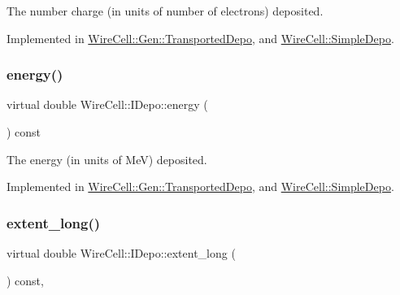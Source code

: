 The number charge (in units of number of electrons) deposited. 



Implemented in \hyperlink{class_wire_cell_1_1_gen_1_1_transported_depo_a448ef0f9244cb3802103f0e15afaa7fa}{Wire\+Cell\+::\+Gen\+::\+Transported\+Depo}, and \hyperlink{class_wire_cell_1_1_simple_depo_a07e9a03fcc18207e8e55ac3ed201828c}{Wire\+Cell\+::\+Simple\+Depo}.

\mbox{\label{class_wire_cell_1_1_i_depo_a5dad2495f4b329fede8397203824f311}} 
\subsubsection{\texorpdfstring{energy()}{energy()}}
{\footnotesize\ttfamily virtual double Wire\+Cell\+::\+I\+Depo\+::energy (\begin{DoxyParamCaption}{ }\end{DoxyParamCaption}) const\hspace{0.3cm}{\ttfamily [pure virtual]}}



The energy (in units of MeV) deposited. 



Implemented in \hyperlink{class_wire_cell_1_1_gen_1_1_transported_depo_a126a3460f7f190b9049bfbbe1b988607}{Wire\+Cell\+::\+Gen\+::\+Transported\+Depo}, and \hyperlink{class_wire_cell_1_1_simple_depo_acea11f65dc7accc767a196963d93cd02}{Wire\+Cell\+::\+Simple\+Depo}.

\mbox{\label{class_wire_cell_1_1_i_depo_a196f71d7d22bf0b85948e2ff8e557c9c}} 
\subsubsection{\texorpdfstring{extent\+\_\+long()}{extent\_long()}}
{\footnotesize\ttfamily virtual double Wire\+Cell\+::\+I\+Depo\+::extent\+\_\+long (\begin{DoxyParamCaption}{ }\end{DoxyParamCaption}) const\hspace{0.3cm}{\ttfamily [inline]}, {\ttfamily [virtual]}}

